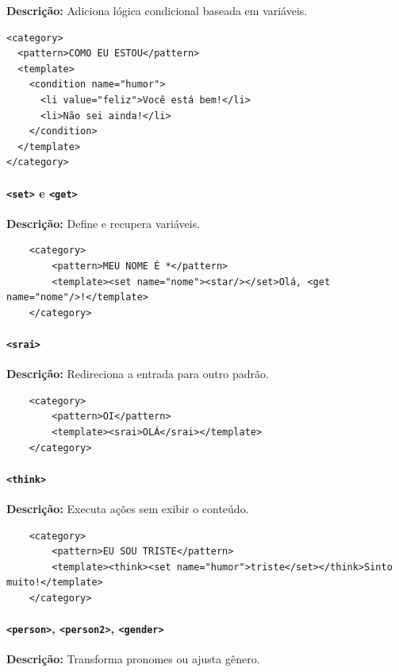 \documentclass[14pt,a4paper,oneside]{book}
\begin{document}
\textbf{Descrição:} Adiciona lógica condicional baseada em variáveis. 

\begin{lstlisting}
<category>
  <pattern>COMO EU ESTOU</pattern>
  <template>
    <condition name="humor">
      <li value="feliz">Você está bem!</li>
      <li>Não sei ainda!</li>
    </condition>
  </template>
</category>
\end{lstlisting}

\paragraph{\texttt{<set>} e \texttt{<get>}} 

\textbf{Descrição:} Define e recupera variáveis. 

\begin{lstlisting}
	<category>
		<pattern>MEU NOME É *</pattern>
		<template><set name="nome"><star/></set>Olá, <get name="nome"/>!</template>
	</category>
\end{lstlisting}

\paragraph{\texttt{<srai>}} 

\textbf{Descrição:} Redireciona a entrada para outro padrão. 

\begin{lstlisting}
	<category>
		<pattern>OI</pattern>
		<template><srai>OLÁ</srai></template>
	</category>
\end{lstlisting}

\paragraph{\texttt{<think>}} 

\textbf{Descrição:} Executa ações sem exibir o conteúdo. 

\begin{lstlisting}
	<category>
		<pattern>EU SOU TRISTE</pattern>
		<template><think><set name="humor">triste</set></think>Sinto muito!</template>
	</category>
\end{lstlisting}

\paragraph{\texttt{<person>}, \texttt{<person2>}, \texttt{<gender>}} 

\textbf{Descrição:} Transforma pronomes ou ajusta gênero. 
\end{document}
